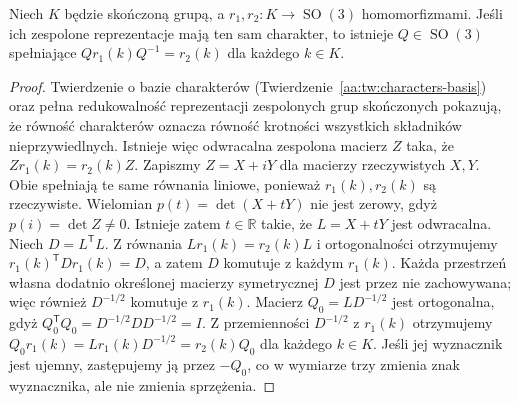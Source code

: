 \begin{lemat}
\label{aa:lem:binary-real-intertwiner}
Niech $K$ będzie skończoną grupą,
a $r_1,r_2:K\to\operatorname{SO}(3)$ homomorfizmami.
Jeśli ich zespolone reprezentacje mają ten sam charakter,
to istnieje $Q\in\operatorname{SO}(3)$ spełniające
$Qr_1(k)Q^{-1}=r_2(k)$ dla każdego $k\in K$.
\end{lemat}
\begin{proof}
Twierdzenie o bazie charakterów
(Twierdzenie~\ref{aa:tw:characters-basis})
oraz pełna redukowalność reprezentacji zespolonych
grup skończonych pokazują, że równość charakterów
oznacza równość krotności wszystkich składników
nieprzywiedlnych. Istnieje więc odwracalna
zespolona macierz $Z$ taka, że
$Zr_1(k)=r_2(k)Z$.
Zapiszmy $Z=X+iY$ dla macierzy rzeczywistych $X,Y$.
Obie spełniają te same równania liniowe, ponieważ
$r_1(k),r_2(k)$ są rzeczywiste.
Wielomian $p(t)=\det(X+tY)$ nie jest zerowy,
gdyż $p(i)=\det Z\ne0$. Istnieje zatem $t\in\mathbb R$
takie, że $L=X+tY$ jest odwracalna.
Niech $D=L^{\mathsf T}L$.
Z równania $Lr_1(k)=r_2(k)L$ i ortogonalności
otrzymujemy $r_1(k)^{\mathsf T}Dr_1(k)=D$,
a zatem $D$ komutuje z każdym $r_1(k)$.
Każda przestrzeń własna dodatnio określonej
macierzy symetrycznej $D$ jest przez nie zachowywana;
więc również $D^{-1/2}$ komutuje z $r_1(k)$.
Macierz $Q_0=LD^{-1/2}$ jest ortogonalna, gdyż
$Q_0^{\mathsf T}Q_0=D^{-1/2}DD^{-1/2}=I$.
Z przemienności $D^{-1/2}$ z $r_1(k)$ otrzymujemy
$Q_0r_1(k)=Lr_1(k)D^{-1/2}=r_2(k)Q_0$
dla każdego $k\in K$.
Jeśli jej wyznacznik jest ujemny, zastępujemy ją
przez $-Q_0$, co w wymiarze trzy zmienia znak wyznacznika,
ale nie zmienia sprzężenia.
\end{proof}

